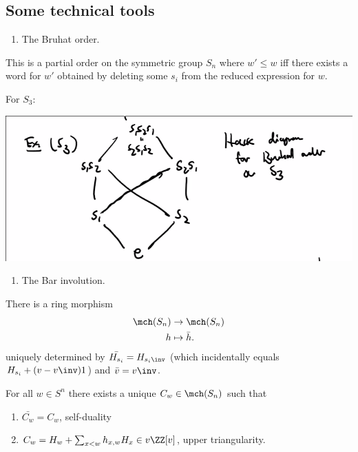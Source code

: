 \hypertarget{some-technical-tools}{%
\subsection{Some technical tools}\label{some-technical-tools}}

\begin{enumerate}
\def\labelenumi{(\arabic{enumi})}
\tightlist
\item
  The Bruhat order.
\end{enumerate}

This is a partial order on the symmetric group \(S_n\) where
\(w'\leq w\) iff there exists a word for \(w'\) obtained by deleting
some \(s_i\) from the reduced expression for \(w\).

\begin{example}

For \(S_3\):

\includegraphics{figures/image_2020-07-13-11-54-42.png}

\end{example}

\begin{enumerate}
\def\labelenumi{(\arabic{enumi})}
\setcounter{enumi}{1}
\tightlist
\item
  The Bar involution.
\end{enumerate}

There is a ring morphism
\begin{align*}
\mch(S_n) &\to \mch(S_n) \\
h &\mapsto \bar h
.\end{align*} uniquely determined by \(\bar{H_{s_i}} = H_{s_i\inv}\)
(which incidentally equals \(H_{s_i} + (v-v\inv)1\)) and
\(\bar v = v\inv\).

\begin{theorem}[KL-Soergel]

For all \(w\in S^n\) there exists a unique \(C_w \in \mch(S_n)\) such
that

\begin{enumerate}
\def\labelenumi{\arabic{enumi}.}
\tightlist
\item
  \(\bar{C_w} = C_w\), self-duality
\item
  \(C_w = H_w + \sum_{x < w} h_{x, w} H_x \in v\ZZ[v]\), upper
  triangularity.
\end{enumerate}

\end{theorem}

